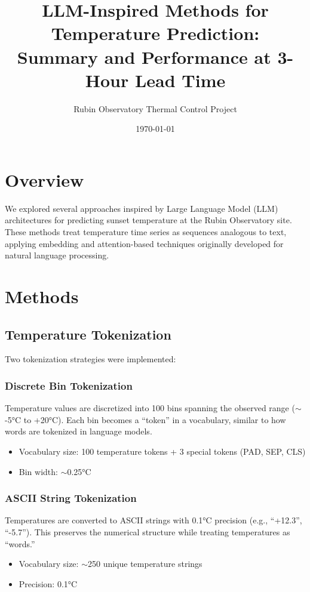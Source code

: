 \documentclass[11pt]{article}
\title{LLM-Inspired Methods for Temperature Prediction:\\Summary and Performance at 3-Hour Lead Time}
\author{Rubin Observatory Thermal Control Project}
\date{\today}
\begin{document}
\maketitle

\section{Overview}

We explored several approaches inspired by Large Language Model (LLM) architectures for predicting sunset temperature at the Rubin Observatory site. These methods treat temperature time series as sequences analogous to text, applying embedding and attention-based techniques originally developed for natural language processing.

\section{Methods}

\subsection{Temperature Tokenization}

Two tokenization strategies were implemented:

\subsubsection{Discrete Bin Tokenization}
Temperature values are discretized into 100 bins spanning the observed range ($\sim$-5°C to +20°C). Each bin becomes a ``token'' in a vocabulary, similar to how words are tokenized in language models.
\begin{itemize}
    \item Vocabulary size: 100 temperature tokens + 3 special tokens (PAD, SEP, CLS)
    \item Bin width: $\sim$0.25°C
\end{itemize}

\subsubsection{ASCII String Tokenization}
Temperatures are converted to ASCII strings with 0.1°C precision (e.g., ``+12.3'', ``-5.7''). This preserves the numerical structure while treating temperatures as ``words.''
\begin{itemize}
    \item Vocabulary size: $\sim$250 unique temperature strings
    \item Precision: 0.1°C
\end{itemize}
\end{document}
